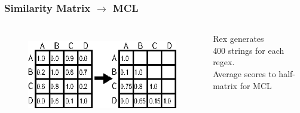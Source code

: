 \begin{frame}
\frametitle{Similarity Matrix $\rightarrow$ MCL}

\begin{columns}[t] %
\begin{figure}[h]
  \centering
  \includegraphics[scale=1]{nontex/illustrations/matrixToGraph.eps}
  \label{fig:matrixToGraph}
\end{figure}
\begin{center}
Rex  generates \\
400 strings for each regex.\\
Average scores to half-matrix for MCL\\
\end{center}
\end{columns}
\end{frame}










